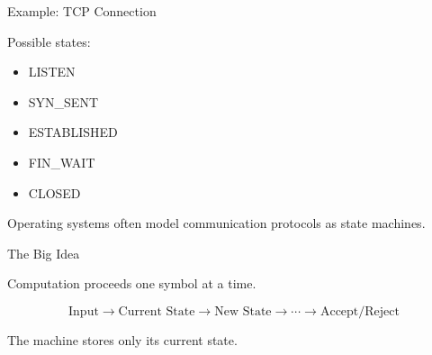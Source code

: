 \documentclass[10pt,aspectratio=169]{beamer}
\begin{document}
\begin{frame}{Example: TCP Connection}

Possible states:

\begin{itemize}
\item LISTEN
\item SYN\_SENT
\item ESTABLISHED
\item FIN\_WAIT
\item CLOSED
\end{itemize}

\vspace{1em}

Operating systems often model communication protocols as state machines.

\end{frame}

\begin{frame}{The Big Idea}

Computation proceeds one symbol at a time.

\[
\text{Input}
\rightarrow
\text{Current State}
\rightarrow
\text{New State}
\rightarrow
\cdots
\rightarrow
\text{Accept/Reject}
\]

\vspace{1em}

The machine stores only its current state.

\end{frame}
\end{document}
